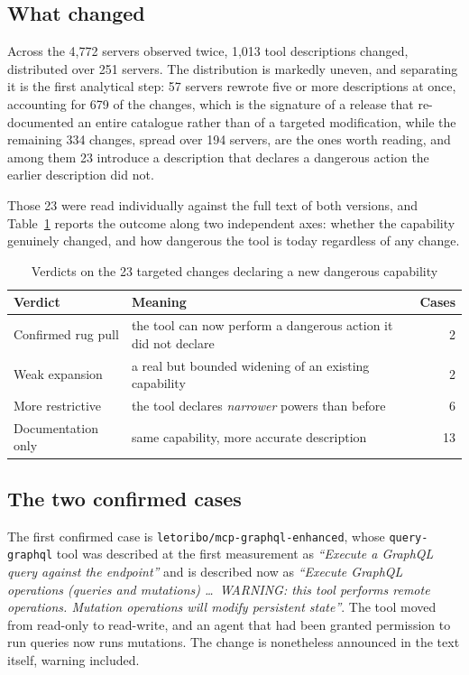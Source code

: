 \subsection{What changed}

Across the 4,772 servers observed twice, 1,013 tool descriptions changed,
distributed over 251 servers. The distribution is markedly uneven, and separating
it is the first analytical step: 57 servers rewrote five or more descriptions at
once, accounting for 679 of the changes, which is the signature of a release that
re-documented an entire catalogue rather than of a targeted modification, while
the remaining 334 changes, spread over 194 servers, are the ones worth reading,
and among them 23 introduce a description that declares a dangerous action the
earlier description did not.

Those 23 were read individually against the full text of both versions, and
Table~\ref{tab:long:verdicts} reports the outcome along two independent axes:
whether the capability genuinely changed, and how dangerous the tool is today
regardless of any change.

\begin{table}[htbp]
\centering
\caption{Verdicts on the 23 targeted changes declaring a new dangerous capability}
\label{tab:long:verdicts}
\begin{tabular}{llr}
\toprule
Verdict & Meaning & Cases \\
\midrule
Confirmed rug pull & the tool can now perform a dangerous action it did not declare & 2 \\
Weak expansion     & a real but bounded widening of an existing capability & 2 \\
More restrictive   & the tool declares \emph{narrower} powers than before & 6 \\
Documentation only & same capability, more accurate description & 13 \\
\bottomrule
\end{tabular}
\end{table}

\subsection{The two confirmed cases}

The first confirmed case is \texttt{letoribo/mcp-graphql-enhanced}, whose
\texttt{query-graphql} tool was described at the first measurement as
\emph{``Execute a GraphQL query against the endpoint''} and is described now as
\emph{``Execute GraphQL operations (queries and mutations) \dots\ WARNING: this
tool performs remote operations. Mutation operations will modify persistent
state''}. The tool moved from read-only to read-write, and an agent that had been
granted permission to run queries now runs mutations. The change is nonetheless
announced in the text itself, warning included.

